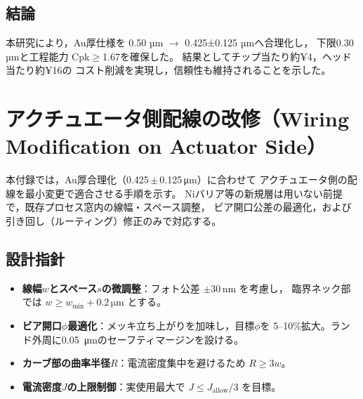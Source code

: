 \documentclass[conference]{IEEEtran}
\begin{document}
\subsection{結論}
本研究により，Au厚仕様を
0.50 µm $\rightarrow$ 0.425±0.125 µmへ合理化し，
下限0.30 µmと工程能力 Cpk$\geq$1.67を確保した。
結果としてチップ当たり約¥4，ヘッド当たり約¥16の
コスト削減を実現し，信頼性も維持されることを示した。

\appendices
\section{アクチュエータ側配線の改修（Wiring Modification on Actuator Side）}

本付録では，Au厚合理化（0.425\,$\pm$\,0.125\,\si{\micro\metre}）に合わせて
アクチュエータ側の配線を最小変更で適合させる手順を示す。
Niバリア等の新規層は用いない前提で，既存プロセス窓内の線幅・スペース調整，
ビア開口公差の最適化，および引き回し（ルーティング）修正のみで対応する。

\subsection{設計指針}
\begin{itemize}
  \item \textbf{線幅$w$とスペース$s$の微調整}：フォト公差 $\pm30$\,nm を考慮し，
        臨界ネック部では $w\geq w_{\min}+0.2\,\si{\micro\metre}$ とする。
  \item \textbf{ビア開口$\phi$最適化}：メッキ立ち上がりを加味し，目標$\phi$を
        5--10\%拡大。ランド外周に\SI{0.05}{\micro\metre}のセーフティマージンを設ける。
  \item \textbf{カーブ部の曲率半径$R$}：電流密度集中を避けるため $R\geq 3w$。
  \item \textbf{電流密度$J$の上限制御}：実使用最大で $J\leq J_{\text{allow}}/3$ を目標。
\end{itemize}
\end{document}
